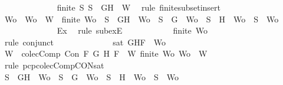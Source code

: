 \begin{isabellebody}
\ \ \ \ \ \ \ \ \ \ \ \ \isamarkupfalse%
\ {\isacartoucheopen}finite\ S{\isacartoucheclose}\ {\isacartoucheopen}S\ {\isasymsubseteq}\ {\isacharbraceleft}G{\isacharcomma}H{\isacharbraceright}\ {\isasymunion}\ W{\isacartoucheclose}\ \isamarkupfalse%
\ {\isacharparenleft}rule\ finite{\isacharunderscore}subset{\isacharunderscore}insert{}{\isacharparenright}\isanewline
\ \ \ \ \ \ \ \ \ \ \isamarkupfalse%
\ Wo\ \ {\isachardoublequoteopen}Wo\ {\isasymsubseteq}\ W{\isachardoublequoteclose}\ \ {}{\isacharcolon}{\isachardoublequoteopen}finite\ Wo\ {\isasymand}\ {\isacharparenleft}S\ {\isacharequal}\ {\isacharbraceleft}G{\isacharcomma}H{\isacharbraceright}\ {\isasymunion}\ Wo\ {\isasymor}\ S\ {\isacharequal}\ {\isacharbraceleft}G{\isacharbraceright}\ {\isasymunion}\ Wo\ {\isasymor}\ S\ {\isacharequal}\ {\isacharbraceleft}H{\isacharbraceright}\ {\isasymunion}\ Wo\ {\isasymor}\ S\ {\isacharequal}\ Wo{\isacharparenright}{\isachardoublequoteclose}\isanewline
\ \ \ \ \ \ \ \ \ \ \ \ \isamarkupfalse%
\ Ex\ \isamarkupfalse%
\ {\isacharparenleft}rule\ subexE{\isacharparenright}\isanewline
\ \ \ \ \ \ \ \ \ \ \isamarkupfalse%
\ {\isachardoublequoteopen}finite\ Wo{\isachardoublequoteclose}\isanewline
\ \ \ \ \ \ \ \ \ \ \ \ \isamarkupfalse%
\ {}\ \isamarkupfalse%
\ {\isacharparenleft}rule\ conjunct{}{\isacharparenright}\isanewline
\ \ \ \ \ \ \ \ \ \ \ \ \isamarkupfalse%
\ {\isachardoublequoteopen}sat\ {\isacharparenleft}{\isacharbraceleft}G{\isacharcomma}H{\isacharcomma}F{\isacharbraceright}\ {\isasymunion}\ Wo{\isacharparenright}{\isachardoublequoteclose}\ \isanewline
\ \ \ \ \ \ \ \ \ \ \ \ \ \ \isamarkupfalse%
\ {\isacartoucheopen}W\ {\isasymin}\ colecComp{\isacartoucheclose}\ {\isacartoucheopen}Con\ F\ G\ H{\isacartoucheclose}\ {\isacartoucheopen}F\ {\isasymin}\ W{\isacartoucheclose}\ {\isacartoucheopen}finite\ Wo{\isacartoucheclose}\ {\isacartoucheopen}Wo\ {\isasymsubseteq}\ W{\isacartoucheclose}\ \isamarkupfalse%
\ {\isacharparenleft}rule\ pcp{\isacharunderscore}colecComp{\isacharunderscore}CON{\isacharunderscore}sat{\isacharparenright}\isanewline
\ \ \ \ \ \ \ \ \ \ \isamarkupfalse%
\ {\isachardoublequoteopen}S\ {\isacharequal}\ {\isacharbraceleft}G{\isacharcomma}H{\isacharbraceright}\ {\isasymunion}\ Wo\ {\isasymor}\ S\ {\isacharequal}\ {\isacharbraceleft}G{\isacharbraceright}\ {\isasymunion}\ Wo\ {\isasymor}\ S\ {\isacharequal}\ {\isacharbraceleft}H{\isacharbraceright}\ {\isasymunion}\ Wo\ {\isasymor}\ S\ {\isacharequal}\ Wo{\isachardoublequoteclose}\isanewline

\end{isabellebody}

